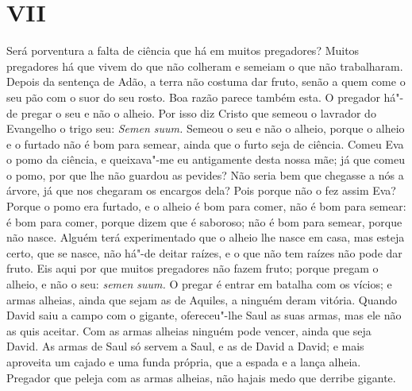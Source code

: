 \section{VII}

Será porventura a falta de ciência que há em muitos pregadores? Muitos
pregadores há que vivem do que não colheram e semeiam o que não
trabalharam. Depois da sentença de Adão, a terra não costuma dar fruto,
senão a quem come o seu pão com o suor do seu rosto. Boa razão parece
também esta. O pregador há"-de pregar o seu e não o alheio. Por isso diz
Cristo que semeou o lavrador do Evangelho o trigo seu: \emph{Semen
suum.} Semeou o seu e não o alheio, porque o alheio e o furtado não é
bom para semear, ainda que o furto seja de ciência. Comeu Eva o pomo da
ciência, e queixava"-me eu antigamente desta nossa mãe; já que comeu o
pomo, por que lhe não guardou as pevides? Não seria bem que chegasse a
nós a árvore, já que nos chegaram os encargos dela? Pois porque não o
fez assim Eva? Porque o pomo era furtado, e o alheio é bom para
comer, não é bom para semear: é bom para comer, porque dizem que é
saboroso; não é bom para semear, porque não nasce. Alguém terá
experimentado que o alheio lhe nasce em casa, mas esteja certo, que se
nasce, não há"-de deitar raízes, e o que não tem raízes não pode dar
fruto. Eis aqui por que muitos pregadores não fazem fruto; porque pregam
o alheio, e não o seu: \emph{semen suum.} O pregar é entrar em batalha
com os vícios; e armas alheias, ainda que sejam as de Aquiles, a ninguém
deram vitória. Quando David saiu a campo com o gigante, ofereceu"-lhe
Saul as suas armas, mas ele não as quis aceitar. Com as armas alheias ninguém
pode vencer, ainda que seja David. As armas de Saul só servem a Saul, e
as de David a David; e mais aproveita um cajado e uma funda própria, que
a espada e a lança alheia. Pregador que peleja com as armas alheias, não
hajais medo que derribe gigante.


